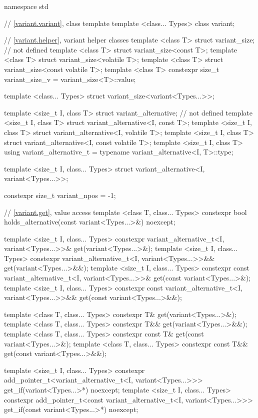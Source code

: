\begin{codeblock}
namespace std {
  // \ref{variant.variant}, class template 
  template <class... Types>
    class variant;

  // \ref{variant.helper}, variant helper classes
  template <class T> struct variant_size;                   // not defined
  template <class T> struct variant_size<const T>;
  template <class T> struct variant_size<volatile T>;
  template <class T> struct variant_size<const volatile T>;
  template <class T>
    constexpr size_t variant_size_v = variant_size<T>::value;

  template <class... Types>
    struct variant_size<variant<Types...>>;

  template <size_t I, class T> struct variant_alternative;  // not defined
  template <size_t I, class T> struct variant_alternative<I, const T>;
  template <size_t I, class T> struct variant_alternative<I, volatile T>;
  template <size_t I, class T> struct variant_alternative<I, const volatile T>;
  template <size_t I, class T>
    using variant_alternative_t = typename variant_alternative<I, T>::type;

  template <size_t I, class... Types>
    struct variant_alternative<I, variant<Types...>>;

  constexpr size_t variant_npos = -1;

  // \ref{variant.get}, value access
  template <class T, class... Types>
    constexpr bool holds_alternative(const variant<Types...>&) noexcept;

  template <size_t I, class... Types>
    constexpr variant_alternative_t<I, variant<Types...>>& get(variant<Types...>&);
  template <size_t I, class... Types>
    constexpr variant_alternative_t<I, variant<Types...>>&& get(variant<Types...>&&);
  template <size_t I, class... Types>
    constexpr const variant_alternative_t<I, variant<Types...>>& get(const variant<Types...>&);
  template <size_t I, class... Types>
    constexpr const variant_alternative_t<I, variant<Types...>>&& get(const variant<Types...>&&);

  template <class T, class... Types>
    constexpr T& get(variant<Types...>&);
  template <class T, class... Types>
    constexpr T&& get(variant<Types...>&&);
  template <class T, class... Types>
    constexpr const T& get(const variant<Types...>&);
  template <class T, class... Types>
    constexpr const T&& get(const variant<Types...>&&);

  template <size_t I, class... Types>
    constexpr add_pointer_t<variant_alternative_t<I, variant<Types...>>>
      get_if(variant<Types...>*) noexcept;
  template <size_t I, class... Types>
    constexpr add_pointer_t<const variant_alternative_t<I, variant<Types...>>>
      get_if(const variant<Types...>*) noexcept;

}
\end{codeblock}
